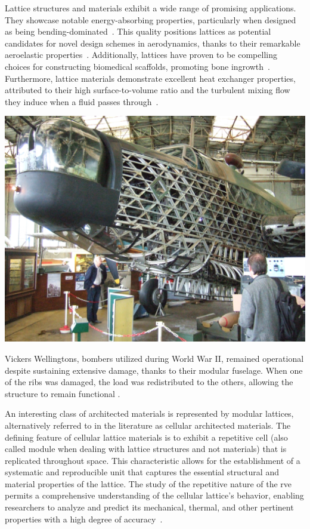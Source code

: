 Lattice structures and materials exhibit a wide range of promising applications. They showcase notable energy-absorbing properties, particularly when designed as being bending-dominated~. This quality positions lattices as potential candidates for novel design schemes in aerodynamics, thanks to their remarkable aeroelastic properties~. Additionally, lattices have proven to be compelling choices for constructing biomedical scaffolds, promoting bone ingrowth~. Furthermore, lattice materials demonstrate excellent heat exchanger properties, attributed to their high surface-to-volume ratio and the turbulent mixing flow they induce when a fluid passes through~.
\begin{marginfigure}
        \includegraphics[width=\linewidth]{figures/02_literature/wellington.jpg}
        \caption{Vickers Wellingtons, bombers utilized during World War II, remained operational despite sustaining extensive damage, thanks to their modular fuselage. When one of the ribs was damaged, the load was redistributed to the others, allowing the structure to remain functional \cite{airshowconsultants_real_2013}.}
        \label{fig:vick}
\end{marginfigure}

An interesting class of architected materials is represented by modular lattices, alternatively referred to in the literature as cellular architected materials. The defining feature of cellular lattice materials is to exhibit a repetitive cell (also called module when dealing with lattice structures and not materials) that is replicated throughout space. This characteristic allows for the establishment of a systematic and reproducible unit that captures the essential structural and material properties of the lattice. The study of the repetitive nature of the \gls{rve} permits a comprehensive understanding of the cellular lattice's behavior, enabling researchers to analyze and predict its mechanical, thermal, and other pertinent properties with a high degree of accuracy~. 

